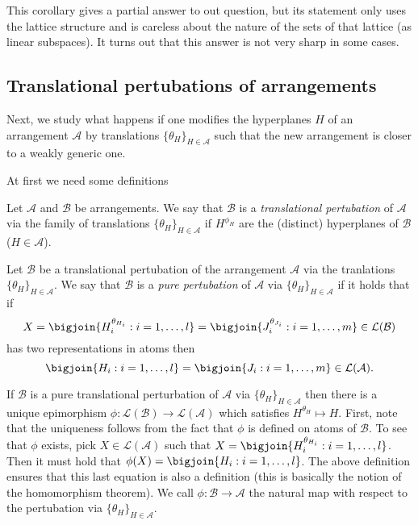\message{ !name(OnTheRAIDProblem.tex)}\documentclass[8pt,a4paper]{article}
\begin{document}
This corollary gives a partial answer to out question, but its statement only uses the lattice structure and is careless about the nature of the sets of that lattice (as linear subspaces). It turns out that this answer is not very sharp in some cases.

\subsection{Translational pertubations of arrangements}

Next, we study what happens if one modifies the hyperplanes $H$ of an arrangement $\mathcal{A}$ by translations $\{\theta_H\}_{H\in\mathcal{A}}$ such that the new arrangement is closer to a weakly generic one.

At first we need some definitions

\begin{definition}
Let $\mathcal{A}$ and $\mathcal{B}$ be arrangements. We say that $\mathcal{B}$ is a \emph{translational pertubation} of $\mathcal{A}$ via the family of translations $\{\theta_H\}_{H\in\mathcal{A}}$ if $H^{\phi_H}$ are the (distinct) hyperplanes of $\mathcal{B}$ ($H\in\mathcal{A}$).
\end{definition}

\begin{definition}
Let $\mathcal{B}$ be a translational pertubation of the arrangement $\mathcal{A}$ via the tranlations $\{\theta_H\}_{H\in\mathcal{A}}$. We say that $\mathcal{B}$ is a \emph{pure pertubation} of $\mathcal{A}$ via $\{\theta_H\}_{H\in\mathcal{A}}$ if it holds that if 
\begin{equation}
X=\bigjoin\{H_i^{\theta_{H_i}}:i=1,\ldots,l\}=\bigjoin\{J_i^{\theta_{J_i}}:i=1,\ldots,m\}\in\mathcal{L}(\mathcal{B})
\end{equation} has two representations in atoms then 
\begin{equation}
\bigjoin\{H_i:i=1,\ldots,l\}=\bigjoin\{J_i:i=1,\ldots,m\}\in\mathcal{L}(\mathcal{A})\text{.}
\end{equation}
\end{definition}

\begin{remark}
If $\mathcal{B}$ is a pure translational perturbation of $\mathcal{A}$ via $\{\theta_H\}_{H\in\mathcal{A}}$ then there is a unique epimorphism $\phi:\mathcal{L}(\mathcal{B})\to\mathcal{L}(\mathcal{A})$ which satisfies $H^{\theta_H}\mapsto H$. First, note that the uniqueness follows from the fact that $\phi$ is defined on atoms of $\mathcal{B}$. To see that $\phi$ exists,
pick $X\in\mathcal{L}(\mathcal{A})$ such that $X=\bigjoin\{H_i^{\theta_{H_i}}:i=1,\ldots,l\}$. Then it must hold that $\phi(X)=\bigjoin\{H_i:i=1,\ldots,l\}$. The above definition ensures that this last equation is also a definition (this is basically the notion of the homomorphism theorem).
We call $\phi:\mathcal{B}\to\mathcal{A}$ the natural map with respect to the pertubation via $\{\theta_H\}_{H\in\mathcal{A}}$. 
\end{remark}
\end{document}
